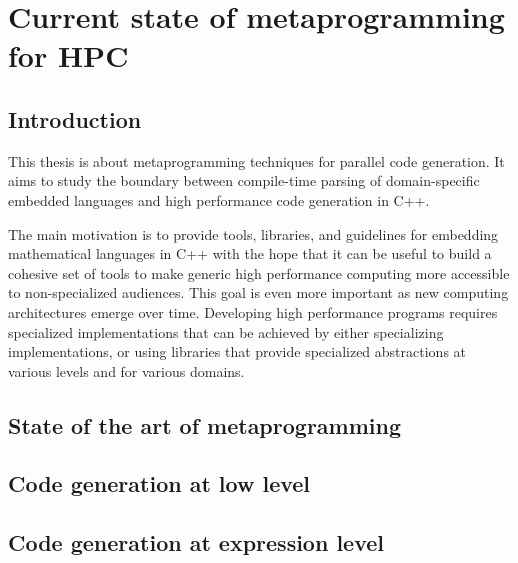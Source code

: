 \documentclass[english,12pt,a4paper]{book}
\providecommand{\cpp}{\textsc{C++}\xspace}
\begin{document}
\tableofcontents




\part{Current state of metaprogramming for HPC}

\chapter{
  Introduction
}

This thesis is about metaprogramming techniques for parallel code generation.
It aims to study the boundary between compile-time parsing of
domain-specific embedded languages and high performance code generation in \cpp.

The main motivation is to provide tools, libraries, and guidelines for embedding
mathematical languages in \cpp with the hope that it can be useful to build a
cohesive set of tools to make generic high performance computing more accessible
to non-specialized audiences. This goal is even more important as new computing
architectures emerge over time. Developing high performance programs requires
specialized implementations that can be achieved by either specializing
implementations, or using libraries that provide specialized abstractions at
various levels and for various domains.

\chapter{
  State of the art of metaprogramming
}




\chapter{
  Code generation at low level
}



\chapter{
  Code generation at expression level
}
\end{document}
